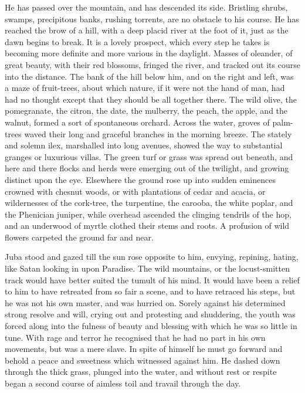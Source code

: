 He has passed over the mountain, and has descended its side.
Bristling shrubs, swamps, precipitous banks, rushing torrents, are no
obstacle to his course. He has reached the brow of a hill, with a deep
placid river at the foot of it, just as the dawn begins to break. It
is a lovely prospect, which every step he takes is becoming more
definite and more various in the daylight. Masses of oleander, of
great beauty, with their red blossoms, fringed the river, and tracked
out its course into the distance. The bank of the hill below him, and
on the right and left, was a maze of fruit-trees, about which nature,
if it were not the hand of man, had had no thought except that they
should be all together there. The wild olive, the pomegranate,
the citron, the date, the mulberry, the peach, the apple, and the
walnut, formed a sort of spontaneous orchard. Across the water, groves
of palm-trees waved their long and graceful branches in the morning
breeze. The stately and solemn ilex, marshalled into long avenues,
showed the way to substantial granges or luxurious villas. The green
turf or grass was spread out beneath, and here and there flocks and
herds were emerging out of the twilight, and growing distinct upon the
eye. Elsewhere the ground rose up into sudden eminences crowned with
chesnut woods, or with plantations of cedar and acacia, or
wildernesses of the cork-tree, the turpentine, the carooba, the white
poplar, and the Phenician juniper, while overhead ascended the
clinging tendrils of the hop, and an underwood of myrtle clothed their
stems and roots. A profusion of wild flowers carpeted the ground far
and near.

Juba stood and gazed till the sun rose opposite to him, envying,
repining, hating, like Satan looking in upon Paradise. The wild
mountains, or the locust-smitten track would have better suited the
tumult of his mind. It would have been a relief to him to have
retreated from so fair a scene, and to have retraced his steps, but he
was not his own master, and was hurried on. Sorely against his
determined strong resolve and will, crying out and protesting and
shuddering, the youth was forced along into the fulness of beauty and
blessing with which he was so little in tune. With rage and
terror he recognised that he had no part in his own movements, but was
a mere slave. In spite of himself he must go forward and behold a
peace and sweetness which witnessed against him. He dashed down
through the thick grass, plunged into the water, and without rest or
respite began a second course of aimless toil and travail through the
day.

